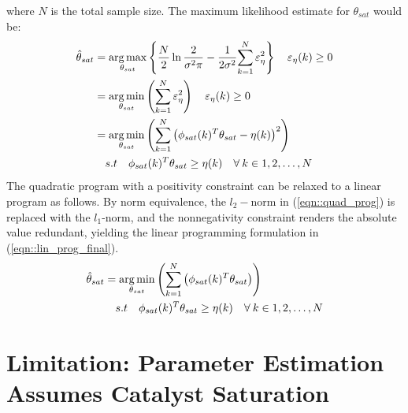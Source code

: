 \documentclass[subscriptcorrection,upint,varvw,barcolor=Goldenrod3,mathalfa=cal=euler,balance,hyphenate,french,pdf-a]{asmejour}
\newcommand{\lr}[1]{\left( #1 \right)}
\newcommand{\lrf}[1]{\left\{ #1 \right\}}
\DeclareMathOperator*{\argmax}{arg\,max}
\DeclareMathOperator*{\argmin}{arg\,min}
\begin{document}
where $N$ is the total sample size. The maximum likelihood estimate for $\theta_{sat}$ would be:
\begin{align}
        \hat \theta_{sat}
         & = \argmax_{\theta_{sat}} \lrf{ \frac{N}{2} \ln \frac{2}{\sigma^2 \pi} - \frac{1}{2 \sigma^2} {\sum_{k=1}^N \varepsilon_\eta^2} } \quad \varepsilon_\eta(k) \geq  0 \notag \\
         & = \argmin_{\theta_{sat}} \lr{\sum_{k=1}^N \varepsilon_\eta^2} \quad \varepsilon_\eta(k) \geq  0 \notag                                                                    \\
         & = \argmin_{\theta_{sat}} \lr{\sum_{k=1}^N \lr{\phi_{sat}(k)^T \theta_{sat} - \eta(k)}^2} \notag                                                                           \\
         & \quad  s.t \quad \phi_{sat}(k)^T \theta_{sat} \geq \eta(k) \quad \forall \: k \in {1,2, \hdots, N}
        \label{eqn::quad_prog}
\end{align}
The quadratic program with a positivity constraint can be relaxed to a linear program as follows. By norm equivalence,
the $l_2-$norm in (\ref{eqn::quad_prog}) is replaced with the $l_1$-norm, and the nonnegativity constraint renders the
absolute value redundant, yielding the linear programming formulation in (\ref{eqn::lin_prog_final}).
\begin{align}
        \hat \theta_{sat}
         & = \argmin_{\theta_{sat}} \lr{\sum_{k=1}^N \lr{\phi_{sat}(k)^T \theta_{sat}}} \notag                \\
         & \quad  s.t \quad \phi_{sat}(k)^T \theta_{sat} \geq \eta(k) \quad \forall \: k \in {1,2, \hdots, N}
        \label{eqn::lin_prog_final}
\end{align}
\section{Limitation: Parameter Estimation Assumes Catalyst Saturation \label{sec::necessary_cond}}
\end{document}
